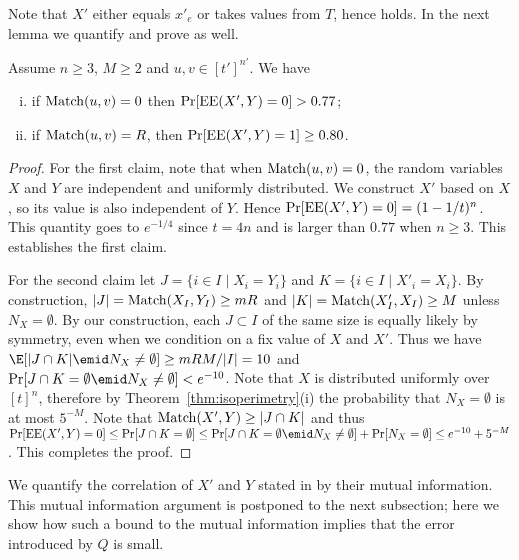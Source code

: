 Note that $X'$ either equals $x'_e$ or takes values from $T$,
hence  holds. In the next lemma we quantify and
prove  as well.

\begin{lemma}
\label{lem:error}
Assume $n\ge3$, $M\ge2$ and $u,v\in[t']^{n'}$. We have
\begin{enumerate}[(i)]
\item 
if $\operatorname{Match}(u,v)=0$ then $\Pr[\operatorname{EE}(X',Y)=0] > 0.77$;
\item 
if $\operatorname{Match}(u,v)=R$, then
$\Pr[\operatorname{EE}(X', Y)=1] \ge 0.80$.
\end{enumerate}
\end{lemma}

\begin{proof}
For the first claim, note that when $\operatorname{Match}(u,v) = 0$, the
random variables $X$ and $Y$ are independent and uniformly
distributed. We construct $X'$ based on $X$, so its value is
also independent of $Y$. Hence $\Pr[\operatorname{EE}(X',Y)=0]=(1-1/t)^n$.
This quantity goes to $e^{-1/4}$ since $t=4n$ and is larger than
$0.77$ when $n\geq 3$. This establishes the first claim.

For the second claim let $J = \{i\in I\mid X_i=Y_i\}$ and
$K=\{i\in I\mid X'_i = X_i\}$. By construction,
$|J|=\operatorname{Match}(X_{I},Y_{I})\ge mR$ and $|K|=\operatorname{Match}(X'_{I}, X_I)
\geq M$ unless $N_X=\emptyset$. By our construction, each
$J\subset I$ of the same size is equally likely by symmetry,
even when we condition on a fix value of $X$ and $X'$. Thus we
have $\E[|J\cap K|\emid N_X\ne\emptyset]\ge mRM/|I|=10$ and
$\Pr[J\cap K=\emptyset\emid N_X\ne\emptyset]<e^{-10}$. Note that
$X$ is distributed uniformly over $[t]^n$, therefore by
Theorem~\ref{thm:isoperimetry}(i) the probability that
$N_X=\emptyset$ is at most $5^{-M}$. Note that
$\operatorname{Match}(X',Y)\ge|J\cap K|$ and thus
$\Pr[\EE(X',Y)=0]\le\Pr[J\cap K=\emptyset]\le\Pr[J\cap
K=\emptyset\emid N_X\ne\emptyset] +\Pr[N_X=\emptyset]\le
e^{-10}+5^{-M}$. This completes the proof.
\end{proof}

We quantify the correlation of $X'$ and $Y$ stated in
 by their mutual information. This mutual
information argument is postponed to the next subsection; here
we show how such a bound to the mutual information implies that
the error introduced by $Q$ is small.

